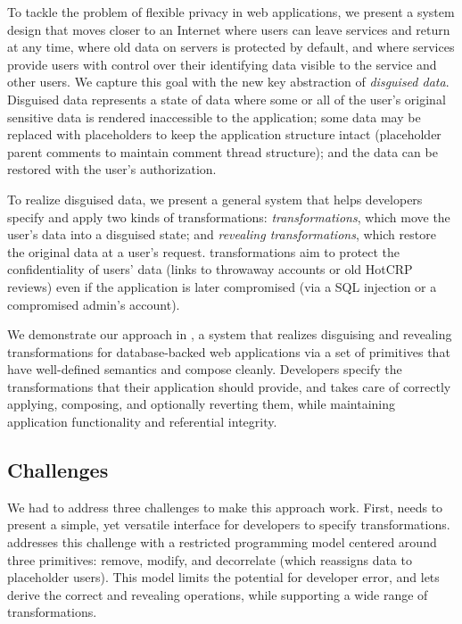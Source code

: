 %
To tackle the problem of flexible privacy in web applications, we present a
system design that moves closer to an Internet where users can leave services
and return at any time, where old data on servers is protected by default, and
where services provide users with control over their identifying data visible to
the service and other users.
%
We capture this goal with the new key abstraction of \emph{disguised data}.
Disguised data represents a state of data where \one{} some or all of the user's
original sensitive data is rendered inaccessible to the application; \two{} some
data may be replaced with placeholders to keep the application structure intact
(\eg placeholder parent comments to maintain comment thread structure); and
\three{} the data can be restored with the user's authorization.
%

To realize disguised data, we present a general system that helps developers
specify and apply two kinds of transformations: \emph{\xxing transformations},
which move the user's data into a disguised state; and \emph{revealing
transformations}, which restore the original data at a user’s request.
%
\Xxing transformations aim to protect the confidentiality of users' \xxed data
(\eg links to throwaway accounts or old HotCRP reviews) even if the application
is later compromised (\eg via a SQL injection or a compromised admin's account).
%

%
We demonstrate our approach in \sys, a system that realizes disguising and
revealing transformations for database-backed web applications via a set of
primitives that have well-defined semantics and compose cleanly.
%
Developers specify the transformations that their application should provide,
and \sys takes care of correctly applying, composing, and optionally reverting
them, while maintaining application functionality and referential integrity.
%

%
\subsection{Challenges}
%
We had to address three challenges to make this approach work.
%
First, \sys needs to present a simple, yet versatile interface for developers to
specify \xxing transformations.
%
\sys addresses this challenge with a restricted programming model centered
around three primitives: remove, modify, and decorrelate (which reassigns data
to placeholder users).
%
This model limits the potential for developer error, and lets \sys derive the
correct \xxing and revealing operations, while supporting a wide range of
transformations.
%

